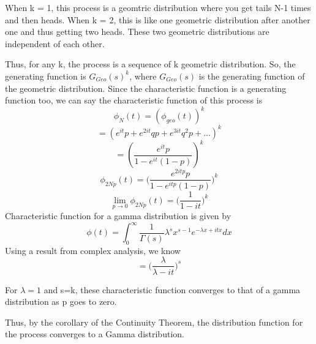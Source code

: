 \documentclass[a4paper,11pt]{article}
\begin{document}
\begin{enumerate}
When k = 1, this process is a geomtric distribution where you get tails N-1 times and then heads.
When k = 2, this is like one geometric distribution after another one and thus getting two heads. These two geometric distributions 
are independent of each other.

Thus, for any k, the process is a sequence of k geometric distribution.
So, the generating function is $G_{Geo}(s)^k$, where $G_{Geo}(s)$ is the generating function of the geometric distribution.
Since the characteristic function is a generating function too, we can say the characteristic function of this process is
\[\phi_N(t)= (\phi_{geo}(t))^k\]
\[= (e^{it}p+e^{2it}qp+e^{3it}q^{2}p+ \ldots )^k\]
\[= (\frac{e^{it}p}{1-e^{it}(1-p)})^k\]
\[\phi_{2Np}(t)= \bigg(\frac{e^{2itp}p}{1-e^{itp}(1-p)}\bigg)^k\]
\[\lim_{p\to 0}\phi_{2Np}(t)= \bigg(\frac{1}{1-it}\bigg)^k\]
Characteristic function for a gamma distribution is given by
\[\phi(t) =\int_0^\infty \frac{1}{\Gamma(s)} \lambda^s x^{s-1} e^{-\lambda x +itx} dx \]
Using a result from complex analysis, we know
\[ =\bigg(\frac{\lambda}{\lambda-it}\bigg)^s\]

For $\lambda=1$ and s=k, these characteristic function converges to that of a gamma distribution as p goes to zero.

Thus, by the corollary of the Continuity Theorem, the distribution function for the process converges to a Gamma distribution.
\end{enumerate} 
\end{document}
